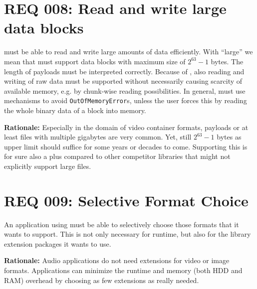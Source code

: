 
\section{REQ 008: Read and write large data blocks}
\label{sec:REQ009LesenSchreibenGrosse}

\LibName{} must be able to read and write large amounts of data efficiently. With ``large'' we mean that \LibName{} must support data blocks with maximum size of $2^{63}-1$ bytes. The length of payloads must be interpreted correctly. Because of , also reading and writing of raw data must be supported without necessarily causing scarcity of available memory, e.g. by chunk-wise reading possibilities. In general, \LibName{} must use mechanisms to avoid \texttt{OutOfMemoryError}s, unless the user forces this by reading the whole binary data of a block into memory. 

\textbf{Rationale:} Especially in the domain of video container formats, payloads or at least files with multiple gigabytes are very common. Yet, still $2^{63}-1$ bytes as upper limit should suffice for some years or decades to come. Supporting this is for sure also a plus compared to other competitor libraries that might not explicitly support large files.


\section{REQ 009: Selective Format Choice}
\label{sec:REQ010SchreibenInAnderesAusgabemediumUnterstuetzt}

An application using \LibName{} must be able to selectively choose those formats that it wants to support. This is not only necessary for runtime, but also for the library extension packages it wants to use.

\textbf{Rationale:} Audio applications do not need extensions for video or image formats. Applications can minimize the runtime and memory (both HDD and RAM) overhead by choosing as few extensions as really needed.

